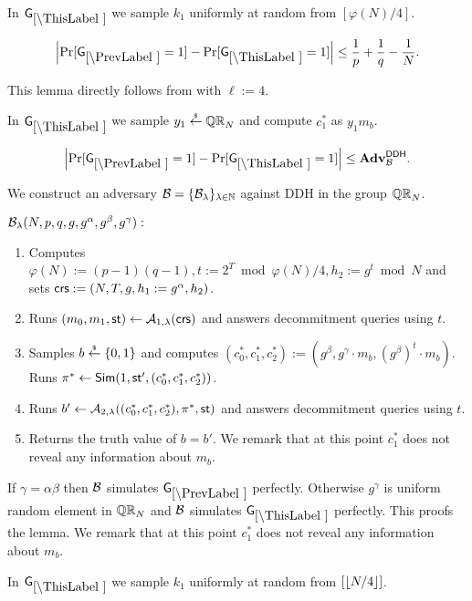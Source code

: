 In $\games_\thisgame$ we sample $k_1$ uniformly at random from $[\varphi(N)/4]$. 

\begin{lemma}
\[
\left|\Pr[\games_\prevgame = 1] - \Pr[\games_\thisgame = 1]\right| \leq \frac{1}{p}+\frac{1}{q}-\frac{1}{N}.
\]
\end{lemma}

This lemma directly follows from  with $\ell:=4$.

In $\games_\thisgame$ we sample $y_1 \stackrel{{\scriptscriptstyle\$}}{\leftarrow} \mathbb{QR}_N$ and compute $c_1^*$ as  $y_1 m_b$. 

\begin{lemma}
\[
\left|\Pr[\games_\prevgame = 1] - \Pr[\games_\thisgame = 1]\right| \leq \advtg_\advB^\ddh.
\]
\end{lemma}
We construct an adversary $\mathcal{B} = \{\mathcal{B}_{\lambda}\}_{\lambda \in \mathbb{N}}$ against DDH in the group $\mathbb{QR}_N$. %

$\mathcal{B}_{\lambda}(N,p,q,g,g^\alpha, g^\beta, g^\gamma):$
\vspace{-2mm}
\begin{enumerate}
\item Computes $\varphi(N):=(p-1)(q-1), t:=2^{T} \bmod \varphi(N)/4, h_2:=g^t \bmod N$ and sets $\mathsf{crs}:=(N, T, g, h_1: = g^\alpha, h_2)$.
\item Runs $(m_0, m_1, \mathsf{st}) \leftarrow \mathcal{A}_{1, \lambda}(\mathsf{crs})$ and answers decommitment queries using $t$.
\item Samples $b \stackrel{{\scriptscriptstyle\$}}{\leftarrow} \{0,1\}$ and computes $(c_0^*, c_1^*, c_2^*):=(g^\beta, g^\gamma \cdot m_b, (g^\beta)^t \cdot m_b).$ Runs $\pi^* \leftarrow \mathsf{Sim}(1, \mathsf{st}', (c_0^*, c_1^*, c_2^*))$.
\item Runs $b' \leftarrow \mathcal{A}_{2, \lambda}((c_0^*, c_1^*, c_2^*), \pi^*, \mathsf{st})$ and answers decommitment queries using $t$.
\item Returns the truth value of $b=b'$. We remark that at this point $c_1^*$ does not reveal any information about $m_b$.
\end{enumerate}
If $\gamma = \alpha\beta$ then $\mathcal{B}$ simulates $\games_\prevgame$ perfectly. Otherwise $g^\gamma$ is uniform random element in $\mathbb{QR}_N$ and $\mathcal{B}$ simulates $\games_\thisgame$ perfectly. This proofs the lemma. We remark that at this point $c_1^*$ does not reveal any information about $m_b$.


In $\games_\thisgame$ we sample $k_1$ uniformly at random from $[\left\lfloor N/4 \right\rfloor]$. 

